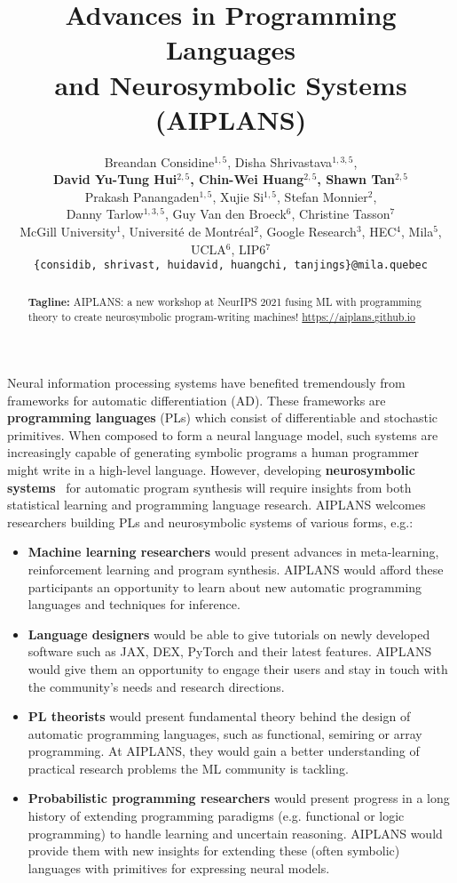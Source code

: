 \documentclass{article}
\title{Advances in Programming Languages\\ and Neurosymbolic Systems (AIPLANS)}
\author{%
    Breandan Considine$^{1, 5}$, Disha Shrivastava$^{1, 3, 5}$, \\\textbf{David Yu-Tung Hui$^{2, 5}$, Chin-Wei Huang$^{2, 5}$, Shawn Tan$^{2, 5}$} \\
    Prakash Panangaden$^{1, 5}$, Xujie Si$^{1, 5}$, Stefan Monnier$^{2}$, \\
    Danny Tarlow$^{1, 3, 5}$, Guy Van den Broeck$^6$, Christine Tasson$^7$\\
    McGill University$^1$, Universit\'e de Montr\'eal$^2$, Google Research$^3$, HEC$^4$, Mila$^5$, UCLA$^6$, LIP6$^7$\\
    \texttt{\{considib, shrivast, huidavid, huangchi, tanjings\}@mila.quebec} \\
}
\begin{document}
    \maketitle
    \vspace{-0.5cm}
    \begin{abstract}
        \textbf{Tagline:} AIPLANS: a new workshop at NeurIPS 2021 fusing ML with programming theory to create neurosymbolic program-writing machines!  \url{https://aiplans.github.io} %
    \end{abstract}


    Neural information processing systems have benefited tremendously from frameworks for automatic differentiation (AD). These frameworks are \textbf{programming languages} (PLs) which consist of differentiable and stochastic primitives. When composed to form a neural language model, such systems are increasingly capable of generating symbolic programs a human programmer might write in a high-level language. However, developing \textbf{neurosymbolic systems}~\cite{wermter2001present} for automatic program synthesis will require insights from both statistical learning and programming language research. AIPLANS welcomes researchers building PLs and neurosymbolic systems of various forms, e.g.:
    \begin{itemize}
        \item \textbf{Machine learning researchers} would present advances in meta-learning, reinforcement learning and program synthesis. AIPLANS would afford these participants an opportunity to learn about new automatic programming languages and techniques for inference.
        \item \textbf{Language designers} would be able to give tutorials on newly developed software such as JAX, DEX, PyTorch and their latest features. AIPLANS would give them an opportunity to engage their users and stay in touch with the community's needs and research directions.
        \item \textbf{PL theorists} would present fundamental theory behind the design of automatic programming languages, such as functional, semiring or array programming. At AIPLANS, they would gain a better understanding of practical research problems the ML community is tackling.
        \item \textbf{Probabilistic programming researchers} would present progress in a long history of extending programming paradigms (e.g. functional or logic programming) to handle learning and uncertain reasoning. AIPLANS would provide them with new insights for extending these (often symbolic) languages with primitives for expressing neural models.
    \end{itemize}
\end{document}
